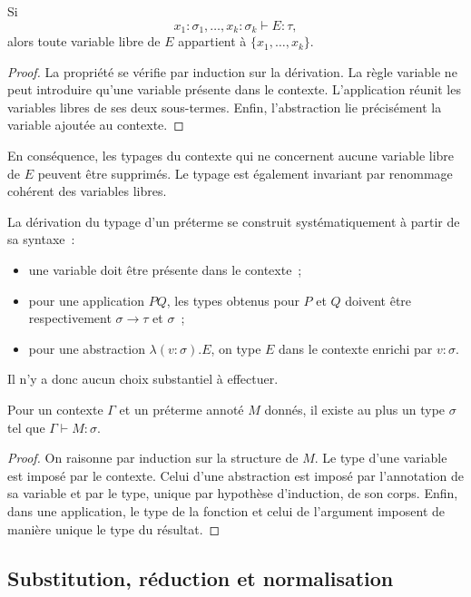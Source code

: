 \begin{prop}
Si
\[
x_1:\sigma_1,\ldots,x_k:\sigma_k\vdash E:\tau,
\]
alors toute variable libre de $E$ appartient à
$\{x_1,\ldots,x_k\}$.
\end{prop}

\begin{proof}
La propriété se vérifie par induction sur la dérivation. La règle
variable ne peut introduire qu'une variable présente dans le contexte.
L'application réunit les variables libres de ses deux sous-termes.
Enfin, l'abstraction lie précisément la variable ajoutée au contexte.
\end{proof}

En conséquence, les typages du contexte qui ne concernent aucune
variable libre de $E$ peuvent être supprimés. Le typage est également
invariant par renommage cohérent des variables libres.

\thingy La dérivation du typage d'un préterme se construit
systématiquement à partir de sa syntaxe :
\begin{itemize}
\item une variable doit être présente dans le contexte ;
\item pour une application $PQ$, les types obtenus pour $P$ et $Q$
  doivent être respectivement $\sigma\to\tau$ et $\sigma$ ;
\item pour une abstraction $\lambda(v:\sigma).E$, on type $E$ dans le
  contexte enrichi par $v:\sigma$.
\end{itemize}
Il n'y a donc aucun choix substantiel à effectuer.

\begin{prop}
Pour un contexte $\Gamma$ et un préterme annoté $M$ donnés, il existe
au plus un type $\sigma$ tel que $\Gamma\vdash M:\sigma$.
\end{prop}

\begin{proof}
On raisonne par induction sur la structure de $M$. Le type d'une
variable est imposé par le contexte. Celui d'une abstraction est imposé
par l'annotation de sa variable et par le type, unique par hypothèse
d'induction, de son corps. Enfin, dans une application, le type de la
fonction et celui de l'argument imposent de manière unique le type du
résultat.
\end{proof}

\subsection{Substitution, réduction et normalisation}


